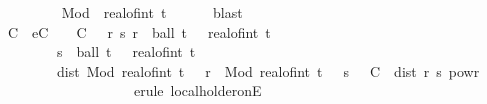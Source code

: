 \begin{isabellebody}
\ \ \ \ \ \ \ \ \isamarkupfalse%
\ Mod{\isacharparenleft}{\kern0pt}{}{\isacharparenright}{\kern0pt}\ {\isasymomega}{\isacharparenleft}{\kern0pt}{}{\isacharparenright}{\kern0pt}\ {\isacartoucheopen}real{\isacharunderscore}{\kern0pt}of{\isacharunderscore}{\kern0pt}int\ {\isasymlfloor}t{\isasymrfloor}\ {\isacharplus}{\kern0pt}\ {}\ {\isachargreater}{\kern0pt}\ {}{\isacartoucheclose}\ \isamarkupfalse%
\ blast\isanewline
\ \ \ \ \ \ \isamarkupfalse%
\ \isamarkupfalse%
\ {\isasymepsilon}\ C\ \ eC{\isacharcolon}{\kern0pt}\ {\isachardoublequoteopen}{\isasymepsilon}\ {\isachargreater}{\kern0pt}\ {}{\isachardoublequoteclose}\ {\isachardoublequoteopen}C\ {\isasymge}\ {}{\isachardoublequoteclose}\ {\isachardoublequoteopen}{\isasymAnd}r\ s{\isachardot}{\kern0pt}\ r\ {\isasymin}\ ball\ t\ {\isasymepsilon}\ {\isasyminter}\ {\isacharbraceleft}{\kern0pt}{}{\isachardot}{\kern0pt}{\isachardot}{\kern0pt}real{\isacharunderscore}{\kern0pt}of{\isacharunderscore}{\kern0pt}int\ {\isasymlfloor}t{\isasymrfloor}\ {\isacharplus}{\kern0pt}\ {}{\isacharbraceright}{\kern0pt}\ {\isasymLongrightarrow}\isanewline
\ \ \ \ \ \ \ \ \ s\ {\isasymin}\ ball\ t\ {\isasymepsilon}\ {\isasyminter}\ {\isacharbraceleft}{\kern0pt}{}{\isachardot}{\kern0pt}{\isachardot}{\kern0pt}real{\isacharunderscore}{\kern0pt}of{\isacharunderscore}{\kern0pt}int\ {\isasymlfloor}t{\isasymrfloor}\ {\isacharplus}{\kern0pt}\ {}{\isacharbraceright}{\kern0pt}\ {\isasymLongrightarrow}\isanewline
\ \ \ \ \ \ \ \ \ dist\ {\isacharparenleft}{\kern0pt}Mod\ {\isacharparenleft}{\kern0pt}real{\isacharunderscore}{\kern0pt}of{\isacharunderscore}{\kern0pt}int\ {\isasymlfloor}t{\isasymrfloor}\ {\isacharplus}{\kern0pt}\ {}{\isacharparenright}{\kern0pt}\ r\ {\isasymomega}{\isacharparenright}{\kern0pt}\ {\isacharparenleft}{\kern0pt}Mod\ {\isacharparenleft}{\kern0pt}real{\isacharunderscore}{\kern0pt}of{\isacharunderscore}{\kern0pt}int\ {\isasymlfloor}t{\isasymrfloor}\ {\isacharplus}{\kern0pt}\ {}{\isacharparenright}{\kern0pt}\ s\ {\isasymomega}{\isacharparenright}{\kern0pt}\ {\isasymle}\ C\ {\isacharasterisk}{\kern0pt}\ dist\ r\ s\ powr\ {\isasymgamma}{\isachardoublequoteclose}\isanewline
\ \ \ \ \ \ \ \ \isamarkupfalse%
\ {\isacharminus}{\kern0pt}\isanewline
\ \ \ \ \ \ \ \ \isamarkupfalse%
\ {\isacharparenleft}{\kern0pt}erule\ local{\isacharunderscore}{\kern0pt}holder{\isacharunderscore}{\kern0pt}onE{\isacharparenright}{\kern0pt}\isanewline

\end{isabellebody}
